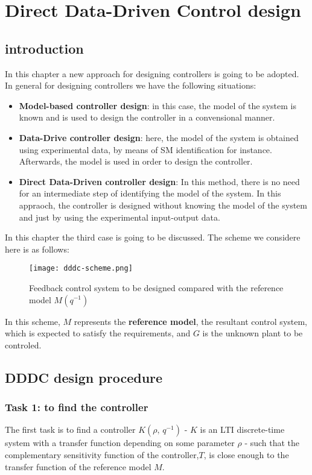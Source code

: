 \chapter{Direct Data-Driven Control design}
\section{introduction}

In this chapter a new approach for designing controllers is going to be adopted. In general for designing controllers we have the following situations:
\begin{itemize}
    \item \textbf{Model-based controller design}: in this case, the model of the system is known and is used to design the controller in a convensional manner.
    
    \item \textbf{Data-Drive controller design}: here, the model of the system is obtained using experimental data, by means of SM identification for instance. Afterwards, the model is used in order to design the controller.
    
    \item \textbf{Direct Data-Driven controller design}: In this method, there is no need for an intermediate step of identifying the model of the system. In this appraoch, the controller is designed without knowing the model of the system and just by using the experimental input-output data.
    
\end{itemize}

In this chapter the third case is going to be discussed. The scheme we considere here is as follows: 
 \begin{figure}[H]
    \centering
    \texttt{[image: dddc-scheme.png]}
    \caption{Feedback control system to be designed compared with the
 reference model $M(q^{-1})$}
 \end{figure}
In this scheme, $M$ represents the \textbf{reference model}, the resultant control system, which is expected to satisfy the requirements, and $G$ is the unknown plant to be controled. 


\section{DDDC design procedure}
\subsection{Task 1: to find the controller}
The first task is to find a controller $K(\rho,\,q^{-1})$ - $K$ is an LTI discrete-time system with a transfer function depending on some parameter $\rho$ - such that the complementary sensitivity function of the controller,$T$, is close enough to the transfer function of the reference model $M$.

